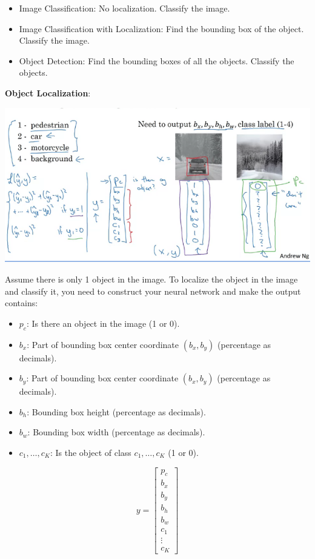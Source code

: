 \documentclass{article}
\begin{document}
\begin{itemize}
    \item Image Classification: No localization. Classify the image.
    \item Image Classification with Localization: Find the bounding box of the object. Classify the image.
    \item Object Detection: Find the bounding boxes of all the objects. Classify the objects.
\end{itemize}

\noindent \textbf{Object Localization}:

\begin{center}
\includegraphics[scale=0.5]{./images/object_localization.png}
\end{center}

\noindent Assume there is only 1 object in the image. To localize the object in the image and classify it, you need to construct your neural network and make the output contains:

\begin{itemize}
    \item \(p_{c}\): Is there an object in the image (1 or 0).
    \item \(b_{x}\): Part of bounding box center coordinate \((b_{x}, b_{y})\) (percentage as decimals).
    \item \(b_{y}\): Part of bounding box center coordinate \((b_{x}, b_{y})\) (percentage as decimals).
    \item \(b_{h}\): Bounding box height (percentage as decimals).
    \item \(b_{w}\): Bounding box width (percentage as decimals).
    \item \(c_{1}, \dots, c_{K}\): Is the object of class \(c_{1}, \dots, c_{K}\) (1 or 0).
\end{itemize}

\[
y =
\begin{bmatrix}
p_{c}\\
b_{x}\\
b_{y}\\
b_{h}\\
b_{w}\\
c_{1}\\
\vdots\\
c_{K}
\end{bmatrix}
\]
\end{document}
